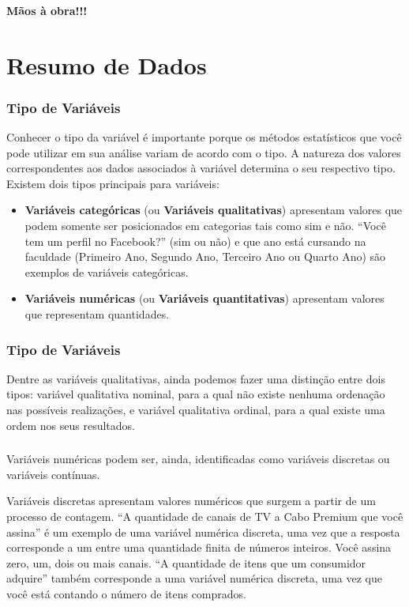 \documentclass[14pt,aspectratio=1610]{beamer}
\begin{document}
\begin{frame}{}
\frametitle{}
\begin{block}{}
\centering
{\Large \bf{Mãos à obra!!!}}
\end{block}
\end{frame}

\section{Resumo de Dados}
\begin{frame}{}
\frametitle{Tipo de Variáveis}
\begin{block}{}
\justifying
Conhecer o tipo da variável é importante porque os métodos estatísticos que você pode utilizar em sua análise variam de acordo com o tipo. A natureza dos valores correspondentes aos dados associados à variável determina o seu respectivo tipo. Existem dois tipos principais para variáveis:
\begin{itemize}
\item {\bf Variáveis categóricas} (ou {\bf Variáveis qualitativas}) apresentam valores que podem somente ser posicionados em categorias tais como sim e não. “Você tem um perfil no Facebook?” (sim ou não) e que ano está cursando na faculdade (Primeiro Ano, Segundo Ano, Terceiro Ano ou Quarto Ano) são exemplos de variáveis categóricas.\pause
\item {\bf Variáveis numéricas} (ou {\bf Variáveis quantitativas}) apresentam valores que representam quantidades.
\end{itemize}
\end{block}
\end{frame}

\begin{frame}{}
\frametitle{Tipo de Variáveis}
\begin{block}{}
\justifying
Dentre as variáveis qualitativas, ainda podemos fazer uma distinção entre dois
tipos: variável qualitativa nominal, para a qual não existe nenhuma ordenação nas
possíveis realizações, e variável qualitativa ordinal, para a qual existe uma ordem
nos seus resultados.
\end{block}
\end{frame}

\begin{frame}{}
\frametitle{}
\begin{block}{}
\justifying
Variáveis numéricas podem ser, ainda, identificadas como variáveis discretas ou variáveis contínuas.
\end{block}
\pause
\begin{block}{}
\justifying
Variáveis discretas apresentam valores numéricos que surgem a partir de um processo de contagem. “A quantidade de canais de TV a Cabo Premium que você assina” é um exemplo de uma variável numérica discreta, uma vez que a resposta corresponde a um entre uma quantidade finita de números inteiros. Você assina zero, um, dois ou mais canais. “A quantidade de itens que um consumidor adquire” também corresponde a uma variável numérica discreta, uma vez que você está contando o número de itens comprados.
\end{block}
\end{frame}
\end{document}
